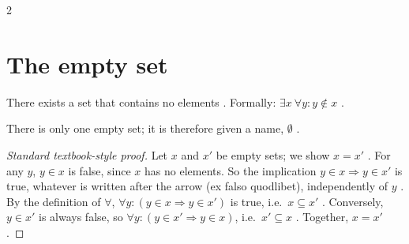 \begin{paracol}{2}
\section{The empty set}\label{sec:se-empty}

\begin{definition}\label{ax:se-empty}
There exists a set that contains no elements . Formally: $\exists x\ \forall y\colon y\notin x$
.
\end{definition}

\begin{theorem}\label{thm:se-empty-unique}
There is only one empty set; it is therefore given a name, $\emptyset$ .
\end{theorem}
\begin{proof}[Standard textbook-style proof]
Let $x$ and $x'$ be empty sets; we show $x=x'$ . For any $y$, $y\in x$ is false, since
$x$ has no elements. So the implication $y\in x\Rightarrow y\in x'$ is true, whatever is written after the arrow (ex
falso quodlibet), independently of $y$ . By the definition of $\forall$,
$\forall y\colon(y\in x\Rightarrow y\in x')$ is true, i.e.\ $x\subseteq x'$ . Conversely, $y\in x'$ is
always false, so $\forall y\colon (y\in x'\Rightarrow y\in x)$, i.e.\ $x'\subseteq x$ .
Together, $x=x'$ .
\end{proof}


\end{paracol}
